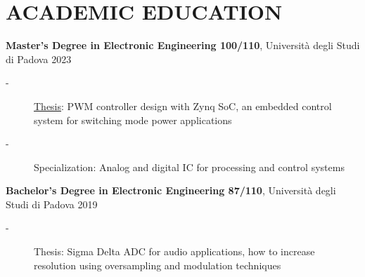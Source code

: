 \section*{ACADEMIC EDUCATION}
\begin{description}[leftmargin=5mm]
    \item \textbf{Master's Degree in Electronic Engineering 100/110}, Università degli Studi di Padova \hfill 2023
    \begin{description}
        \item[-] \href{https://thesis.unipd.it/handle/20.500.12608/48003}{Thesis}: PWM controller design with Zynq SoC, an embedded control system for switching mode power applications
        \item[-] Specialization: Analog and digital IC for processing and control systems
    \end{description}
    \item \textbf{Bachelor's Degree in Electronic Engineering 87/110}, Università degli Studi di Padova \hfill 2019
    \begin{description}
        \item[-] Thesis: Sigma Delta ADC for audio applications, how to increase resolution using oversampling and modulation techniques
    \end{description}
\end{description}